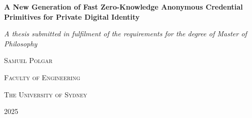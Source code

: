 \begin{titlepage}
    \centering
    {\Huge \textbf{A New Generation of Fast Zero-Knowledge Anonymous Credential Primitives for Private Digital Identity} \par} \vspace{1.5cm}
    {\large \emph{A thesis submitted in fulfilment of the requirements for the degree of Master of Philosophy}\par} \vspace{2cm}
    {\LARGE \textsc{Samuel Polgar} \par} \vspace{9cm}
    {\Large \textsc{Faculty of Engineering}\par}
    {\Large \textsc{The University of Sydney} \par} \vspace{1cm}
    {\large 2025}
\end{titlepage}

